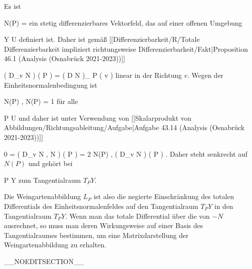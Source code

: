 {

Es ist

\mavergleichskette
{\vergleichskette
{ N(P)
}
{ = }{ {  }
}
{  }{
}
{    }{
}
{   }{
}
}
{}{}{}
ein stetig differenzierbares Vektorfeld, das auf einer offenen Umgebung

\mavergleichskette
{\vergleichskette
{ Y
}
{ \subseteq }{ U
}
{  }{
}
{    }{
}
{   }{
}
}
{}{}{}
definiert ist. Daher ist gemäß
[[Differenzierbarkeit/R/Totale Differenzierbarkeit impliziert richtungsweise Differenzierbarkeit/Fakt|Proposition 46.1 (Analysis (Osnabrück 2021-2023))]]

\mavergleichskettedisp
{\vergleichskette
{ \left(  D_{v}  N   \right) \left(   P  \right)
}
{ =} { \left(  D N   \right)_{ P } \left(  v  \right)
}
{ } {
}
{ } {
}
{ } {
}
}
{}{}{}
linear in der Richtung $v$. Wegen der Einheitsnormalenbedingung ist

\mavergleichskette
{\vergleichskette
{ \left\langle  N(P)  ,  N(P)   \right\rangle
}
{ = }{ 1
}
{  }{
}
{    }{
}
{   }{
}
}
{}{}{}
für alle

\mavergleichskette
{\vergleichskette
{ P
}
{ \in }{ U
}
{  }{
}
{    }{
}
{   }{
}
}
{}{}{}
und daher ist unter Verwendung von
[[Skalarprodukt von Abbildungen/Richtungsableitung/Aufgabe|Aufgabe 43.14 (Analysis (Osnabrück 2021-2023))]]

\mavergleichskettedisp
{\vergleichskette
{ 0
}
{ =} { \left(  D_{v}  \left\langle  N  ,  N  \right\rangle   \right) \left(   P  \right)
}
{ =} { 2 \left\langle  N(P)  ,  \left(  D_{v}  N   \right) \left(   P  \right)   \right\rangle
}
{ } {
}
{ } {
}
}
{}{}{.}
Daher steht
 senkrecht auf $N(P)$ und gehört bei

\mavergleichskette
{\vergleichskette
{ P
}
{ \in }{ Y
}
{  }{
}
{    }{
}
{   }{
}
}
{}{}{}
zum Tangentialraum $T_PY$.

}

Die Weingartenabbildung $L_P$ ist also die negierte Einschränkung des totalen Differentials des Einheitsnormalenfeldes auf den Tangentialraum $T_PY$ in den Tangentialraum $T_PY$. Wenn man das totale Differential über die
von $-N$ ausrechnet, so muss man deren Wirkungsweise auf einer Basis des Tangentialraumes bestimmen, um eine Matrixdarstellung der Weingartenabbildung zu erhalten.

__NOEDITSECTION__

